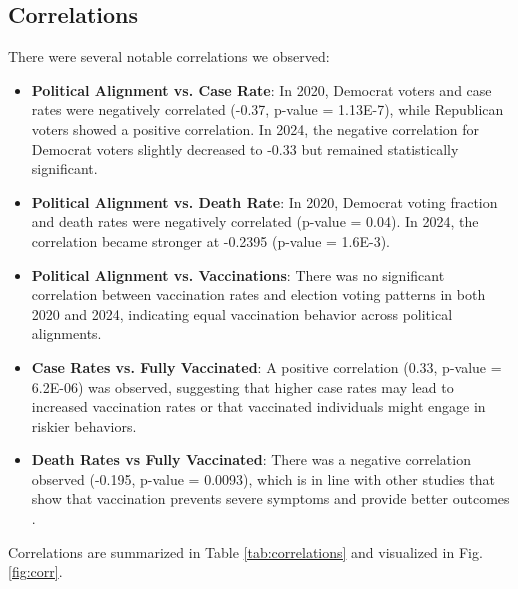 \documentclass[10pt,journal,compsoc]{IEEEtran}
\begin{document}
\subsection{Correlations}

There were several notable correlations we observed:

\begin{itemize}
    \item \textbf{Political Alignment vs. Case Rate}: In 2020, Democrat voters and case rates were negatively correlated (-0.37, p-value = 1.13E-7), while Republican voters showed a positive correlation. In 2024, the negative correlation for Democrat voters slightly decreased to -0.33 but remained statistically significant.
    \item \textbf{Political Alignment vs. Death Rate}: In 2020, Democrat voting fraction and death rates were negatively correlated (p-value = 0.04). In 2024, the correlation became stronger at -0.2395 (p-value = 1.6E-3).
    \item \textbf{Political Alignment vs. Vaccinations}: There was no significant correlation between vaccination rates and election voting patterns in both 2020 and 2024, indicating equal vaccination behavior across political alignments.
    \item \textbf{Case Rates vs. Fully Vaccinated}: A positive correlation (0.33, p-value = 6.2E-06) was observed, suggesting that higher case rates may lead to increased vaccination rates or that vaccinated individuals might engage in riskier behaviors.
    \item \textbf{Death Rates vs Fully Vaccinated}: There was a negative correlation observed (-0.195, p-value = 0.0093), which is in line with other studies that show that vaccination prevents severe symptoms and provide better outcomes \cite{mohammed-covid-vax-review}.
\end{itemize}

Correlations are summarized in Table \ref{tab:correlations} and visualized in Fig. \ref{fig:corr}.
\end{document}
